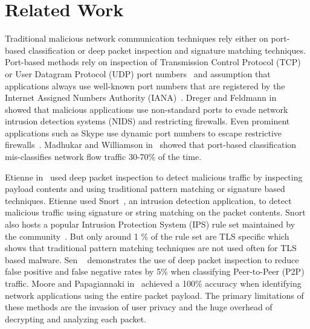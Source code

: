 \chapter{Related Work\label{chap:related}}

Traditional malicious network communication techniques rely either on port-based classification or deep packet inspection and signature matching techniques. Port-based methods rely on inspection of Transmission Control Protocol (TCP) or User Datagram Protocol (UDP) port numbers~\cite{YoonPPOK09} and assumption that applications always use well-known port numbers that are registered by the Internet Assigned Numbers Authority (IANA)~\cite{IANA}. Dreger and Feldmann in~\cite{DregerF06} showed that malicious applications use non-standard ports to evade network intrusion detection systems (NIDS) and restricting firewalls. Even prominent applications such as Skype use dynamic port numbers to escape restrictive firewalls~\cite{BasetS06}. Madhukar and Williamson in~\cite{MadhukarW06} showed that port-based classification mis-classifies network flow traffic 30-70\% of the time. 

Etienne in~\cite{Etienne} used deep packet inspection to detect malicious traffic by inspecting payload contents and using traditional pattern matching or signature based techniques. Etienne used Snort~\cite{Snort}, an intrusion detection application, to detect malicious traffic using signature or string matching on the packet contents. Snort also hosts a popular Intrusion Protection System (IPS) rule set maintained by the community~\cite{SnortCR}. But only around 1 \% of the rule set are TLS specific which shows that traditional pattern matching techniques are not used often for TLS based malware. Sen \etal~\cite{SenSW04} demonstrates the use of deep packet inspection to reduce false positive and false negative rates by 5\% when classifying Peer-to-Peer (P2P) traffic. Moore and Papagiannaki in~\cite{MooreP05} achieved a 100\% accuracy when identifying network applications using the entire packet payload. The primary limitations of these methods are the invasion of user privacy and the huge overhead of decrypting and analyzing each packet.

